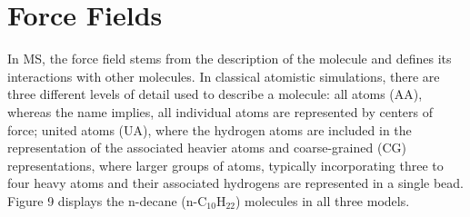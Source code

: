 \documentclass{scrbook}
\begin{document}
\section{Force Fields}

In MS, the force field stems from the description of the molecule and defines
its interactions with other molecules. In classical atomistic simulations,
there are three different levels of detail used to describe a molecule: all
atoms (AA), whereas the name implies, all individual atoms are represented by
centers of force; united atoms (UA), where the hydrogen atoms are included in
the representation of the associated heavier atoms and coarse-grained (CG)
representations, where larger groups of atoms, typically incorporating three to
four heavy atoms and their associated hydrogens are represented in a single
bead. Figure 9 displays the n-decane (n-C$_{10}$H$_{22}$)  molecules in all
three models.
\end{document}
